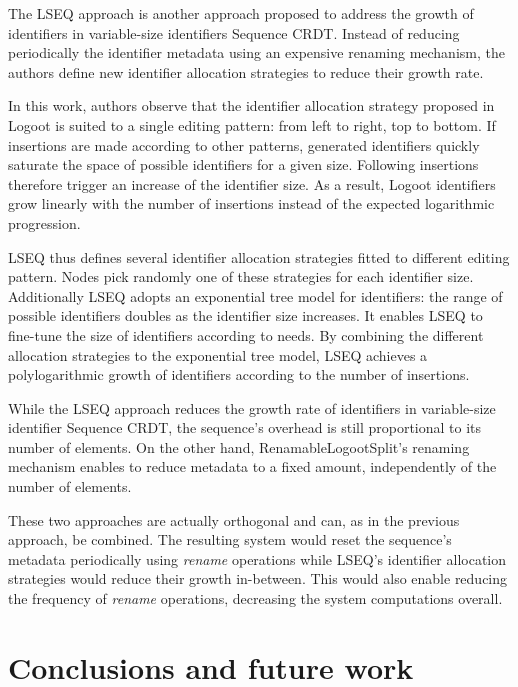 \documentclass[10pt,journal,compsoc]{IEEEtran}
\begin{document}
The LSEQ approach \cite{lseq2013, lseq2017} is another approach proposed to address the growth of identifiers in variable-size identifiers Sequence \ac{CRDT}. Instead of reducing periodically the identifier metadata using an expensive renaming mechanism, the authors define new identifier allocation strategies to reduce their growth rate.

In this work, authors observe that the identifier allocation strategy proposed in Logoot\cite{WeissICDCS09} is suited to a single editing pattern: from left to right, top to bottom.
If insertions are made according to other patterns, generated identifiers quickly saturate the space of possible identifiers for a given size.
Following insertions therefore trigger an increase of the identifier size.
As a result, Logoot identifiers grow linearly with the number of insertions instead of the expected logarithmic progression.

LSEQ thus defines several identifier allocation strategies fitted to different editing pattern.
Nodes pick randomly one of these strategies for each identifier size.
Additionally LSEQ adopts an exponential tree model for identifiers: the range of possible identifiers doubles as the identifier size increases.
It enables LSEQ to fine-tune the size of identifiers according to needs.
By combining the different allocation strategies to the exponential tree model, LSEQ achieves a polylogarithmic growth of identifiers according to the number of insertions.

While the LSEQ approach reduces the growth rate of identifiers in variable-size identifier Sequence \ac{CRDT}, the sequence's overhead is still proportional to its number of elements.
On the other hand, RenamableLogootSplit's renaming mechanism enables to reduce metadata to a fixed amount, independently of the number of elements.

These two approaches are actually orthogonal and can, as in the previous approach, be combined.
The resulting system would reset the sequence's metadata periodically using \emph{rename} operations while LSEQ's identifier allocation strategies would reduce their growth in-between.
This would also enable reducing the frequency of \emph{rename} operations, decreasing the system computations overall.

\section{Conclusions and future work}
\label{sec:conclusion}
\end{document}
